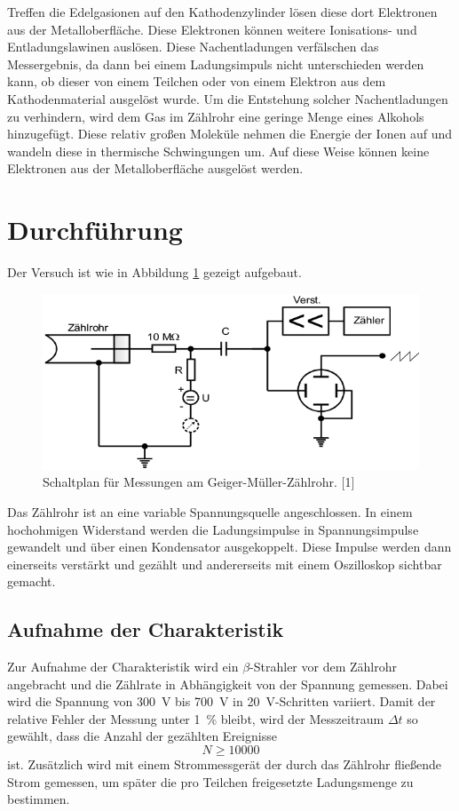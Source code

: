 \documentclass[11pt,ngerman,a4paper]{article}
\begin{document}
\noindent
Treffen die Edelgasionen auf den Kathodenzylinder lösen diese dort Elektronen aus der Metalloberfläche. Diese Elektronen können weitere Ionisations- und Entladungslawinen auslösen. Diese Nachentladungen verfälschen das Messergebnis, da dann bei einem Ladungsimpuls nicht unterschieden werden kann, ob dieser von einem Teilchen oder von einem Elektron aus dem Kathodenmaterial ausgelöst wurde. Um die Entstehung solcher Nachentladungen zu verhindern, wird dem Gas im Zählrohr eine geringe Menge eines Alkohols hinzugefügt. Diese relativ großen Moleküle nehmen die Energie der Ionen auf und wandeln diese in thermische Schwingungen um. Auf diese Weise können keine Elektronen aus der Metalloberfläche ausgelöst werden.
\section{Durchführung}
Der Versuch ist wie in Abbildung \ref{abb4} gezeigt aufgebaut.
\begin{figure}[htp]
\centering
\includegraphics[scale=0.5]{abb4.png}
\caption{Schaltplan für Messungen am Geiger-Müller-Zählrohr. [1]}
\label{abb4}
\end{figure}
Das Zählrohr ist an eine variable Spannungsquelle angeschlossen. In einem hochohmigen Widerstand werden die Ladungsimpulse in Spannungsimpulse gewandelt und über einen Kondensator ausgekoppelt. Diese Impulse werden dann einerseits verstärkt und gezählt und andererseits mit einem Oszilloskop sichtbar gemacht.
\subsection{Aufnahme der Charakteristik}
Zur Aufnahme der Charakteristik wird ein $\beta$-Strahler vor dem Zählrohr angebracht und die Zählrate in Abhängigkeit von der Spannung gemessen. Dabei wird die Spannung von \SI{300}{\volt} bis \SI{700 }{\volt} in \SI{20}{\volt}-Schritten variiert. Damit der relative Fehler der Messung unter \SI{1}{\percent} bleibt, wird der Messzeitraum $\Delta t$
so gewählt, dass die Anzahl der gezählten Ereignisse
\[
N \geq \num{10000}
\]
ist. Zusätzlich wird mit einem Strommessgerät der durch das Zählrohr fließende Strom gemessen, um später die pro Teilchen freigesetzte Ladungsmenge zu bestimmen. 
\end{document}
